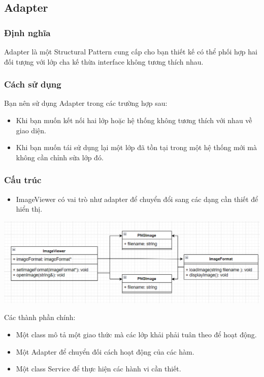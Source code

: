 \subsection{Adapter}
\subsubsection{Định nghĩa}
Adapter là một Structural Pattern cung cấp cho bạn thiết kế có thể phối hợp hai đối tượng với lớp cha kế thừa interface không tương thích nhau.
\subsubsection{Cách sử dụng}
Bạn nên sử dụng Adapter trong các trường hợp sau:
\begin{itemize}
    \item Khi bạn muốn kết nối hai lớp hoặc hệ thống không tương thích với nhau về giao diện.
    \item Khi bạn muốn tái sử dụng lại một lớp đã tồn tại trong một hệ thống mới mà không cần chỉnh sửa lớp đó.
\end{itemize}
\subsubsection{Cấu trúc}
\begin{itemize}
    \item ImageViewer có vai trò như adapter để chuyển đổi sang các dạng cần thiết để hiển thị.
\end{itemize}
\begin{center}
    \includegraphics[scale=0.75]{image/structural/adapter.png}
\end{center}
Các thành phần chính:
\begin{itemize}
    \item Một class mô tả một giao thức mà các lớp khải phải tuân theo để hoạt động.
    \item Một Adapter để chuyển đối cách hoạt động của các hàm.
    \item Một class Service để thực hiện các hành vi cần thiết.
\end{itemize}
